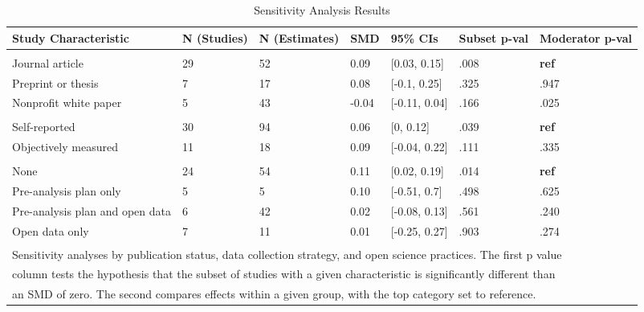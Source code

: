 \documentclass[sn-nature,referee,pdflatex]{sn-jnl}
\begin{document}
\begin{table}[!ht]
\centering
\caption{\label{tab:table_three}Sensitivity Analysis Results}
\centering
\begin{tabular}[t]{lllllll}
\toprule
Study Characteristic & N (Studies) & N (Estimates) & SMD & 95\% CIs & Subset p-val & Moderator p-val\\
\midrule
\addlinespace[0.3em]
\multicolumn{7}{l}{\textbf{Publication Status}}\\
\hspace{1em}Journal article & 29 & 52 & 0.09 & {}[0.03, 0.15] & .008 & \textbf{ref}\\
\hspace{1em}Preprint or thesis & 7 & 17 & 0.08 & {}[-0.1, 0.25] & .325 & .947\\
\hspace{1em}Nonprofit white paper & 5 & 43 & -0.04 & {}[-0.11, 0.04] & .166 & .025\\
\addlinespace[0.3em]
\multicolumn{7}{l}{\textbf{Data Collection Strategy}}\\
\hspace{1em}Self-reported & 30 & 94 & 0.06 & {}[0, 0.12] & .039 & \textbf{ref}\\
\hspace{1em}Objectively measured & 11 & 18 & 0.09 & {}[-0.04, 0.22] & .111 & .335\\
\addlinespace[0.3em]
\multicolumn{7}{l}{\textbf{Open Science}}\\
\hspace{1em}None & 24 & 54 & 0.11 & {}[0.02, 0.19] & .014 & \textbf{ref}\\
\hspace{1em}Pre-analysis plan only & 5 & 5 & 0.10 & {}[-0.51, 0.7] & .498 & .625\\
\hspace{1em}Pre-analysis plan and open data & 6 & 42 & 0.02 & {}[-0.08, 0.13] & .561 & .240\\
\hspace{1em}Open data only & 7 & 11 & 0.01 & {}[-0.25, 0.27] & .903 & .274\\
\bottomrule
\multicolumn{7}{l}{\textsuperscript{} Sensitivity analyses by publication status, data collection strategy, and open science practices. The first p value}\\
\multicolumn{7}{l}{column tests the hypothesis that the subset of studies with a given characteristic is significantly different than}\\
\multicolumn{7}{l}{an SMD of zero. The second compares effects within a given group, with the top category set to reference.}\\
\end{tabular}
\end{table}
\end{document}
